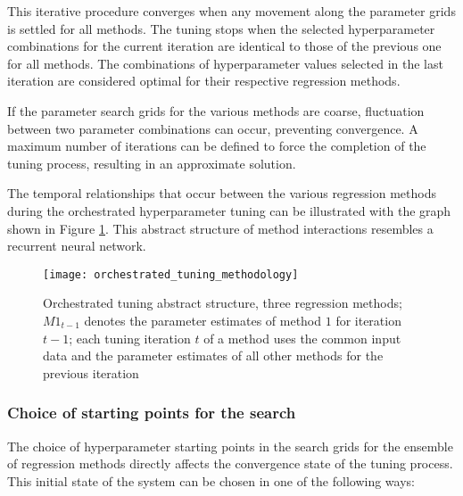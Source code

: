 This iterative procedure converges when any movement along the parameter grids is settled for all methods. The tuning stops when the selected hyperparameter combinations for the current iteration are identical to those of the previous one for all methods. The combinations of hyperparameter values selected in the last iteration are considered optimal for their respective regression methods.

If the parameter search grids for the various methods are coarse, fluctuation between two parameter combinations can occur, preventing convergence. A maximum number of iterations can be defined to force the completion of the tuning process, resulting in an approximate solution. 

The temporal relationships that occur between the various regression methods during the orchestrated hyperparameter tuning can be illustrated with the graph shown in Figure \ref{fig:orc_tun_struct}. This abstract structure of method interactions resembles a recurrent neural network.

\begin{figure}[H]
	\centering
	\texttt{[image: orchestrated\_tuning\_methodology]}
	\caption{Orchestrated tuning abstract structure, three regression methods; $M1_{t-1}$ denotes the parameter estimates of method $1$ for iteration $t-1$; each tuning iteration $t$ of a method uses the common input data and the parameter estimates of all other methods for the previous iteration}
	\label{fig:orc_tun_struct}
\end{figure}

\subsubsection{Choice of starting points for the search}
The choice of hyperparameter starting points in the search grids for the ensemble of regression methods directly affects the convergence state of the tuning process. This initial state of the system can be chosen in one of the following ways:

